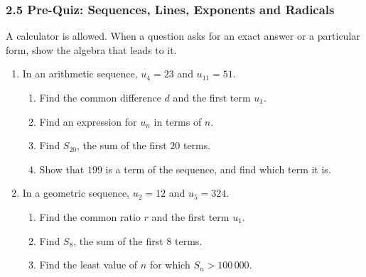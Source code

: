 \documentclass[12pt, twoside]{article}
\begin{document}
\subsubsection*{2.5 Pre-Quiz: Sequences, Lines, Exponents and Radicals}

A calculator is allowed. When a question asks for an exact answer or a
particular form, show the algebra that leads to it.

\begin{enumerate}[itemsep=0.15cm]

\item[1.]
In an arithmetic sequence, $u_{4} = 23$ and $u_{11} = 51$.

\begin{enumerate}[itemsep=0.1cm]
  \item Find the common difference $d$ and the first term $u_{1}$.
  \item Find an expression for $u_{n}$ in terms of $n$.
  \item Find $S_{20}$, the sum of the first $20$ terms.
  \item Show that $199$ is a term of the sequence, and find which term
  it is.
\end{enumerate}


\newpage

\item[2.]
In a geometric sequence, $u_{2} = 12$ and $u_{5} = 324$.

\begin{enumerate}[itemsep=0.1cm]
  \item Find the common ratio $r$ and the first term $u_{1}$.
  \item Find $S_{8}$, the sum of the first $8$ terms.
  \item Find the least value of $n$ for which $S_{n} > 100\,000$.
\end{enumerate}


\end{enumerate}
\end{document}
